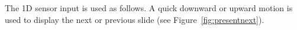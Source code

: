 \documentclass[12pt,a4paper,oneside,openright]{book}
\newcommand{\fig}[1]{Figure~\ref{fig:#1}}
\begin{document}
\begin{CJK}{UTF8}{}
The \ac{1D} sensor input is used as follows. A quick downward or upward motion is used to display the next or previous slide (see \fig{presentnext}).
\begin{figure}[htbp]
  \begin{center}
    \begin{minipage}[t]{.47\textwidth}
      \begin{center}
      \end{center}
    \end{minipage}
    \begin{minipage}[t]{.47\textwidth}
      \begin{center}
      \end{center}
     \end{minipage}\medskip\\
     \begin{minipage}[t]{.47\textwidth}
      \begin{center}

\end{center}
\end{minipage}
\end{center}
\end{figure}
\end{CJK}
\end{document}
